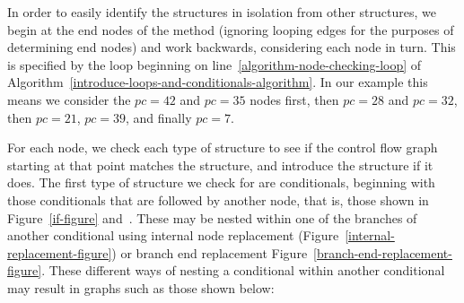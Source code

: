 In order to easily identify the structures in isolation from other
structures, we begin at the end nodes of the method (ignoring looping
edges for the purposes of determining end nodes) and work backwards,
considering each node in turn.
This is specified by the loop beginning on
line~\ref{algorithm-node-checking-loop} of
Algorithm~\ref{introduce-loops-and-conditionals-algorithm}.
In our example this means we consider the $pc=42$ and $pc=35$ nodes
first, then $pc=28$ and $pc=32$, then $pc=21$, $pc=39$, and finally
$pc=7$.

For each node, we check each type of structure to see if the control
flow graph starting at that point matches the structure, and introduce
the structure if it does.
The first type of structure we check for are conditionals, beginning
with those conditionals that are followed by another node, that is,
those shown in Figure~\ref{if-figure} and~.
These may be nested within one of the branches of another conditional
using internal node replacement
(Figure~\ref{internal-replacement-figure}) or branch end replacement
Figure~\ref{branch-end-replacement-figure}. 
These different ways of nesting a conditional within another
conditional may result in graphs such as those shown below:
\begin{center}
  \hfill
\end{center}
